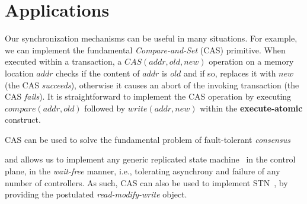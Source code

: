 \documentclass[conference]{sigcomm-alternate}
\newcommand{\hide}[1]{}
\newcommand{\cas}{CAS\xspace}
\newcommand{\compare}{compare\xspace}
\newcommand{\memwrite}{write\xspace}
\newcommand{\addr}{\textit{addr}\xspace}
\newcommand{\execatomic}{\textbf{execute-atomic}}
\newcommand{\true}{\textit{true}}
\newcommand{\false}{\textit{false}}
\begin{document}
\section{Applications}\label{sec:apps}

Our synchronization mechanisms can be useful in many situations.
For example, we can implement the fundamental
\emph{Compare-and-Set} (CAS) primitive. %
When executed within a
transaction, a $\cas(\addr,\textit{old},\textit{new})$ operation 
on a memory location $\addr$
checks if the content of $\addr$ is $\textit{old}$ and if so,
replaces it with $\textit{new}$ %
(the CAS \emph{succeeds}), otherwise it 
causes an abort of the invoking transaction
(the CAS \emph{fails}).
It is straightforward to implement the CAS operation by executing
$\textit{\compare}(\addr, old)$ followed by $\textit{\memwrite}(\addr,
new)$ within the {\execatomic} construct.

\hide{
As can be seen Algorithm \ref{alg:cas}, CAS is implemented by two commands. These commands should be sent as part of the same bundle

\begin{algorithm}[t]
    \caption{$\textit{\cas}(\addr, old,new)$}
    \label{alg:cas}
    \begin{algorithmic}[1]

    		\State $cmd1\gets \textsc{\compare}(\addr, old) $
    		\State $cmd2\gets \textsc{\memwrite}(\addr, new) $
			\Return $cmd1,cmd2$
    \end{algorithmic}
\end{algorithm}
}

CAS can be used to solve the fundamental
problem of fault-tolerant \emph{consensus}~\cite{FLP85}
\hide{%
 in which the controllers
need to agree on one of their private inputs, despite failures of an
arbitrary number of controllers.
Indeed, each controller simply performs, within a transaction, a CAS operation to replace the default value
in a memory location at the meta-configuration of a data plane switch.
If the transaction commits, the controller considers itself
the \emph{winner} and decides on its input,
if it aborts (the controller fails in the CAS), it remains to read the
memory to get the input of the winner and decide on it.
}
and allows us
to implement any generic replicated state machine~\cite{Her91}
in the control plane,  in the \emph{wait-free} manner, i.e., tolerating
asynchrony and failure of any number of controllers.
As such, CAS can also be used to implement STN~\cite{stn},
by providing the postulated \emph{read-modify-write} object.
\end{document}
